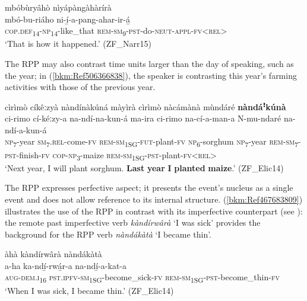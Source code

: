 \ea
\label{bkm:Ref431382075}
mbóbùryâhò nìyápàngàhàrírà\\
\gll mbó-bu-riáho    ni-í̲-a-pang-ahar-ir-á̲\\
\textsc{cop}.\textsc{def}\textsubscript{14}-\textsc{np}\textsubscript{14}-like\_that  \textsc{rem}-\textsc{sm}\textsubscript{9}-\textsc{pst}-do-\textsc{neut}-\textsc{appl}-\textsc{fv}<\textsc{rel}>\\
\glt ‘That is how it happened.’ (ZF\_Narr15)
\z

The RPP may also contrast time units larger than the day of speaking, such as the year; in (\ref{bkm:Ref506366838}), the speaker is contrasting this year’s farming activities with those of the previous year.

\ea
\label{bkm:Ref506366838}
cìrìmò cíkêːzyà nàndínàkúná màyìrà cìrìmò nàcámànà mùndáré \textbf{nàndáꜝ}\textbf{kúnà}\\
\gll ci-rimo  cí-kéːzy-a    na-ndí-na-kun-á    ma-ira ci-rimo  na-cí-a-man-a N-mu-ndaré    na-ndí-a-kun-á \\
\textsc{np}\textsubscript{7}-year  \textsc{sm}\textsubscript{7}.\textsc{rel}-come-\textsc{fv}  \textsc{rem}-\textsc{sm}\textsubscript{1SG}-\textsc{fut}-plant-\textsc{fv}  \textsc{np}\textsubscript{6}-sorghum
\textsc{np}\textsubscript{7}-year  \textsc{rem}-\textsc{sm}\textsubscript{7}-\textsc{pst}-finish-\textsc{fv}
\textsc{cop}-\textsc{np}\textsubscript{3}-maize  \textsc{rem}-\textsc{sm}\textsubscript{1SG}-\textsc{pst}-plant-\textsc{fv}<\textsc{rel}>\\
\glt ‘Next year, I will plant sorghum. \textbf{Last} \textbf{year} \textbf{I} \textbf{planted} \textbf{maize}.’ (ZF\_Elic14)
\z

The RPP expresses perfective aspect; it presents the event’s nucleus as a single event and does not allow reference to its internal structure. (\ref{bkm:Ref467683809}) illustrates the use of the RPP in contrast with its imperfective counterpart (see ): the remote past imperfective verb \textit{kàndírwârà} ‘I was sick’ provides the background for the RPP verb \textit{nàndákàtà} ‘I became thin’.

\ea
\label{bkm:Ref467683809}
àhà kàndírwârà nàndákàtà\\
\gll a-ha    ka-ndí̲-rwá̲r-a      na-ndí̲-a-kat-a\\
\textsc{aug}-\textsc{dem}.\textsc{i}\textsubscript{16}  \textsc{pst}.\textsc{ipfv}-\textsc{sm}\textsubscript{1SG}-become\_sick-\textsc{fv}  \textsc{rem}-\textsc{sm}\textsubscript{1SG}-\textsc{pst}-become\_thin-\textsc{fv}\\
\glt ‘When I was sick, I became thin.’ (ZF\_Elic14)
\z

